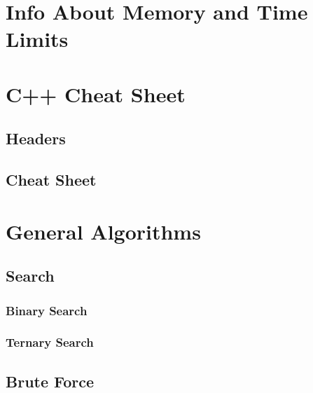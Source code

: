 \documentclass[10pt,landscape,twocolumn,notitlepage]{article}
\makeatletter
\let\org@subfile%
\renewcommand*{}[1]{%
    \filename@parse{#1}%
    \expandafter
    \graphicspath\expandafter{\expandafter{\filename@area}}%
    \expandafter
    \lstset\expandafter{inputpath={\expandafter\filename@area}}
    \org@subfile{#1}%
    \lstset{inputpath=\currfiledir}
}
\makeatother
\begin{document}
\def\title{Nicholas Mc-Donnell's ICPC Notes}
\tableofcontents\newpage

\section{Info About Memory and Time Limits}


\section{C++ Cheat Sheet}
\subsection{Headers}


\subsection{Cheat Sheet}



\section{General Algorithms}
\subsection{Search}
\subsubsection{Binary Search}


\subsubsection{Ternary Search}


\subsection{Brute Force}












\end{document}
